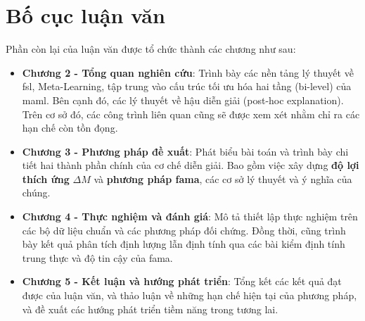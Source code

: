 \section{Bố cục luận văn}
\label{sec:structure}
Phần còn lại của luận văn được tổ chức thành các chương như sau:

\begin{itemize}
    \item \textbf{Chương 2 - Tổng quan nghiên cứu}: Trình bày các nền tảng lý thuyết về \acrlong{fsl}, Meta-Learning, tập trung vào cấu trúc tối ưu hóa hai tầng (bi-level) của \acrshort{maml}. Bên cạnh đó, các lý thuyết về hậu diễn giải (post-hoc explanation). Trên cơ sở đó, các công trình liên quan cũng sẽ được xem xét nhằm chỉ ra các hạn chế còn tồn đọng.

    \item \textbf{Chương 3 - Phương pháp đề xuất}: Phát biểu bài toán và trình bày chi tiết hai thành phần chính của cơ chế diễn giải. Bao gồm việc xây dựng \textbf{độ lợi thích ứng} $\Delta M$ và \textbf{phương pháp \acrfull{fama}}, các cơ sở lý thuyết và ý nghĩa của chúng.

    \item \textbf{Chương 4 - Thực nghiệm và đánh giá}: Mô tả thiết lập thực nghiệm trên các bộ dữ liệu chuẩn và các phương pháp đối chứng. Đồng thời, cũng trình bày kết quả phân tích định lượng lẫn định tính qua các bài kiểm định tính trung thực và độ tin cậy của \acrshort{fama}.

    \item \textbf{Chương 5 - Kết luận và hướng phát triển}: Tổng kết các kết quả đạt được của luận văn, và thảo luận về những hạn chế hiện tại của phương pháp, và đề xuất các hướng phát triển tiềm năng trong tương lai.
\end{itemize}




